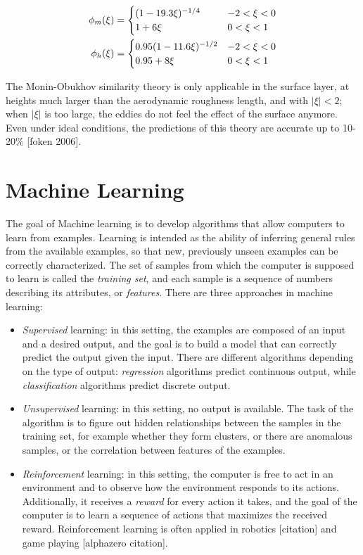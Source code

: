 \documentclass[12pt]{book}
\begin{document}
\begin{align}
\phi_m(\xi)&=\begin{cases}
\label{eq:phi_m_coeff}
\mathrlap{(1-19.3\xi)^{-1/4}} \hphantom{0.95(1-11.6\xi)^{-1/2}} & -2<\xi<0 \\
1+6\xi & 0<\xi<1\\
\end{cases} \\
\phi_h(\xi)&=\begin{cases}
0.95(1-11.6\xi)^{-1/2} & -2<\xi<0 \\
0.95+8\xi & 0<\xi<1
\end{cases}
\end{align}

The Monin-Obukhov similarity theory is only applicable in the surface layer, at heights much larger than the aerodynamic roughness length, and with $\vert\xi\vert<2$; when $\vert\xi\vert$ is too large, the eddies do not feel the effect of the surface anymore. Even under ideal conditions, the predictions of this theory are accurate up to 10-20\% [foken 2006].

\section{Machine Learning}
The goal of Machine learning is to develop algorithms that allow computers to learn from examples. Learning is intended as the ability of inferring general rules from the available examples, so that new, previously unseen examples can be correctly characterized. The set of samples from which the computer is supposed to learn is called the \emph{training set}, and each sample is a sequence of numbers describing its attributes, or \emph{features}. There are three approaches in machine learning:

\begin{itemize}
\item \emph{Supervised} learning: in this setting, the examples are composed of an input and a desired output, and the goal is to build a model that can correctly predict the output given the input. There are different algorithms depending on the type of output: \emph{regression} algorithms predict continuous output, while \emph{classification} algorithms predict discrete output.

\item \emph{Unsupervised} learning: in this setting, no output is available. The task of the algorithm is to figure out hidden relationships between the samples in the training set, for example whether they form clusters, or there are anomalous samples, or the correlation between features of the examples.

\item \emph{Reinforcement} learning: in this setting, the computer is free to act in an environment and to observe how the environment responds to its actions. Additionally, it receives a \emph{reward} for every action it takes, and the goal of the computer is to learn a sequence of actions that maximizes the received reward. Reinforcement learning is often applied in robotics [citation] and game playing [alphazero citation].
\end{itemize}
\end{document}
